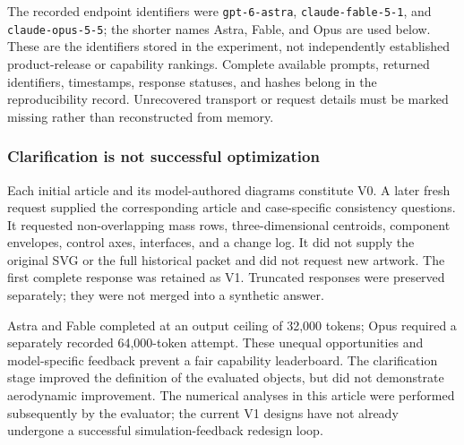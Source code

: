 \documentclass[10pt,letterpaper]{article}
\begin{document}
The recorded endpoint identifiers were \texttt{gpt-6-astra}, \texttt{claude-fable-5-1}, and \texttt{claude-opus-5-5}; the shorter names Astra, Fable, and Opus are used below. These are the identifiers stored in the experiment, not independently established product-release or capability rankings. Complete available prompts, returned identifiers, timestamps, response statuses, and hashes belong in the reproducibility record. Unrecovered transport or request details must be marked missing rather than reconstructed from memory.

\subsubsection{Clarification is not successful optimization}
Each initial article and its model-authored diagrams constitute V0. A later fresh request supplied the corresponding article and case-specific consistency questions. It requested non-overlapping mass rows, three-dimensional centroids, component envelopes, control axes, interfaces, and a change log. It did not supply the original SVG or the full historical packet and did not request new artwork. The first complete response was retained as V1. Truncated responses were preserved separately; they were not merged into a synthetic answer.

Astra and Fable completed at an output ceiling of 32,000 tokens; Opus required a separately recorded 64,000-token attempt. These unequal opportunities and model-specific feedback prevent a fair capability leaderboard. The clarification stage improved the definition of the evaluated objects, but did not demonstrate aerodynamic improvement. The numerical analyses in this article were performed subsequently by the evaluator; the current V1 designs have not already undergone a successful simulation-feedback redesign loop.
\end{document}
